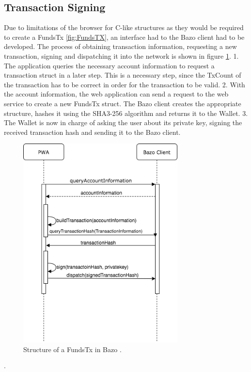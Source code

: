 \subsection{Transaction Signing}\label{transactionsigning}
Due to limitations of the browser for C-like structures as they would be required to create a FundsTx \ref{fig:FundsTX}, an interface had to the Bazo client had to be developed. 
The process of obtaining transaction information, requesting a new transaction, signing and dispatching it into the network is shown in figure \ref{fig:TransactionProcess}.
1. The application queries the necessary account information to request a transaction struct in a later step. This is a necessary step, since the TxCount of the transaction has to be correct in order for the transaction to be valid.
2. With the account information, the web application can send a request to the web service to create a new FundsTx struct. The Bazo client creates the appropriate structure, hashes it using the SHA3-256 algorithm and returns it to the Wallet.
3. The Wallet is now in charge of asking the user about its private key, signing the received transaction hash and sending it to the Bazo client.
\begin{figure}
\centering
\includegraphics[width=0.75\textwidth]{diagrams/transactionProcess.png}
\caption{\label{fig:TransactionProcess}Structure of a FundsTx in Bazo \cite{lisg}.}
\end{figure}.

